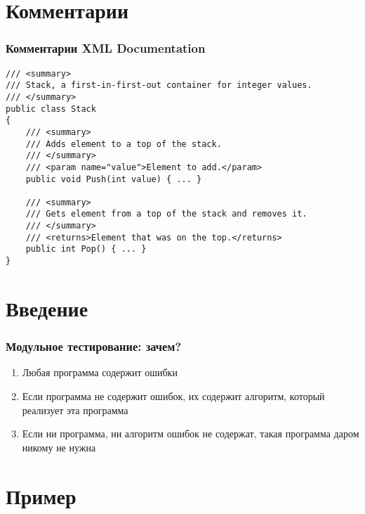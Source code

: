 \documentclass{../../slides-style}
\begin{document}
    
    \begin{frame}[plain]
        \titlepage
    \end{frame}

    \section{Комментарии}

    \begin{frame}[fragile]
        \frametitle{Комментарии XML Documentation}
        \begin{small}
            \begin{verbatim}
/// <summary>
/// Stack, a first-in-first-out container for integer values.
/// </summary>
public class Stack
{
    /// <summary>
    /// Adds element to a top of the stack.
    /// </summary>
    /// <param name="value">Element to add.</param>
    public void Push(int value) { ... }

    /// <summary>
    /// Gets element from a top of the stack and removes it.
    /// </summary>
    /// <returns>Element that was on the top.</returns>
    public int Pop() { ... }
}
            \end{verbatim}
        \end{small}
    \end{frame}

    \section{Введение}

    \begin{frame}
        \frametitle{Модульное тестирование: зачем?}
        \begin{enumerate}
            \item Любая программа содержит ошибки
            \item Если программа не содержит ошибок, их содержит алгоритм, который реализует эта программа
            \item Если ни программа, ни алгоритм ошибок не содержат, такая программа даром никому не нужна
        \end{enumerate}
    \end{frame}

    \section{Пример}
\end{document}
